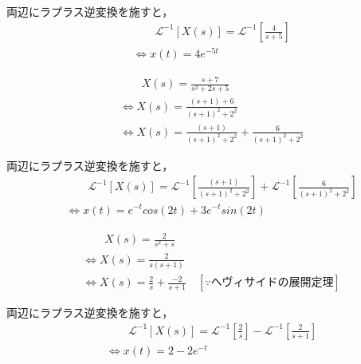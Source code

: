 \documentclass[a4paper,12pt]{article}
\begin{document}
\begin{tcolorbox}[title={ [12] (1) \( X(s)=\frac{4}{s+5} \)}]
\quad 両辺にラプラス逆変換を施すと，
\vspace{-3mm}
\begin{align*}
    &\qquad \mathcal{L}^{-1} \left[ X(s) \right] 
    =\mathcal{L}^{-1} \left[ \frac{4}{s+5} \right] \\
    &\Leftrightarrow x(t) = 4 e^{-5t}
\end{align*}
\end{tcolorbox}
\begin{tcolorbox}[title={ [12] (2) \( X(s)=\frac{ s + 7 }{ s^2 + 2s + 5} \)}]
\vspace{-3mm}
\begin{align*}
    &\qquad X(s) =\frac{ s + 7 }{ s^2 + 2s + 5}  \\
    &\Leftrightarrow X(s) =\frac{ (s + 1) + 6 }{ ( s + 1 )^2+ 2^2} \\
    &\Leftrightarrow X(s) 
    = \frac{ (s + 1) }{ ( s + 1 )^2+ 2^2}
    + \frac{ 6 }{ ( s + 1 )^2+ 2^2} 
\end{align*}

\quad 両辺にラプラス逆変換を施すと，
\vspace{-3mm}
\begin{align*}
    &\qquad \mathcal{L}^{-1} \left[ X(s) \right] 
    =\mathcal{L}^{-1} \left[ \frac{ (s + 1) }{ ( s + 1 )^2+ 2^2} \right]
    +\mathcal{L}^{-1} \left[ \frac{ 6  }{ ( s + 1 )^2+ 2^2} \right] \\
    &\Leftrightarrow x(t) = e^{-t} cos(2t) +3 e^{-t} sin(2t)
\end{align*}
\end{tcolorbox}
\begin{tcolorbox}[title={ [12] (3) \( X(s)=\frac{ 2 }{ s^2 + s } \)}]
\vspace{-3mm}
\begin{align*}
    &\qquad X(s) =\frac{ 2 }{ s^2 + s }  \\
    &\Leftrightarrow X(s) =\frac{ 2 }{ s(s+1) }  \\
    &\Leftrightarrow X(s) 
    = \frac{2}{s}
    + \frac{-2}{s + 1} 
    \quad [\because ヘヴィサイドの展開定理]
\end{align*}

\quad 両辺にラプラス逆変換を施すと，
\vspace{-3mm}
\begin{align*}
    &\qquad \mathcal{L}^{-1} \left[ X(s) \right] 
    =\mathcal{L}^{-1} \left[ \frac{2}{s} \right]
    -\mathcal{L}^{-1} \left[ \frac{2}{s + 1} \right] \\
    &\Leftrightarrow x(t) = 2 - 2 e^{-t}
\end{align*}\end{tcolorbox}
\end{document}
